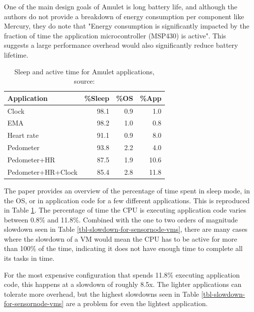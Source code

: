 One of the main design goals of Amulet is long battery life, and although the authors do not provide a breakdown of energy consumption per component like Mercury, they do note that "Energy consumption is significantly impacted by the fraction of time the application microcontroller (MSP430) is active". This suggests a large performance overhead would also significantly reduce battery lifetime.

\begin{table}
\caption[Sleep and active time for Amulet applications]{Sleep and active time for Amulet applications, source: \cite{Hester:2016je}}
\label{tbl-amulet-applications-sleep}
    \begin{tabular}{lrrr} %
        \toprule
        Application        & \%Sleep & \%OS & \%App \\
        \midrule
        \midrule
        Clock              & 98.1    & 0.9  & 1.0 \\
        EMA                & 98.2    & 1.0  & 0.8 \\
        Heart rate         & 91.1    & 0.9  & 8.0 \\
        Pedometer          & 93.8    & 2.2  & 4.0 \\
        Pedometer+HR       & 87.5    & 1.9  & 10.6 \\
        Pedometer+HR+Clock & 85.4    & 2.8  & 11.8 \\
        \bottomrule
    \end{tabular}
\end{table}

The paper provides an overview of the percentage of time spent in sleep mode, in the OS, or in application code for a few different applications. This is reproduced in Table \ref{tbl-amulet-applications-sleep}. The percentage of time the CPU is executing application code varies between 0.8\% and 11.8\%. Combined with the one to two orders of magnitude slowdown seen in Table \ref{tbl-slowdown-for-sensornode-vms}, there are many cases where the slowdown of a VM would mean the CPU has to be active for more than 100\% of the time, indicating it does not have enough time to complete all its tasks in time.

For the most expensive configuration that spends 11.8\% executing application code, this happens at a slowdown of roughly 8.5x. The lighter applications can tolerate more overhead, but the highest slowdowns seen in Table \ref{tbl-slowdown-for-sensornode-vms} are a problem for even the lightest application.

